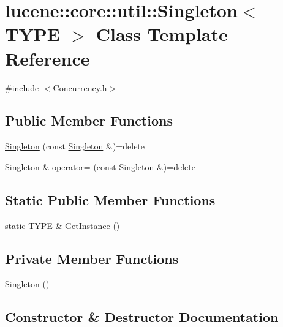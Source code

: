 \hypertarget{classlucene_1_1core_1_1util_1_1Singleton}{}\section{lucene\+:\+:core\+:\+:util\+:\+:Singleton$<$ T\+Y\+PE $>$ Class Template Reference}
\label{classlucene_1_1core_1_1util_1_1Singleton}


{\ttfamily \#include $<$Concurrency.\+h$>$}

\subsection*{Public Member Functions}
\begin{DoxyCompactItemize}
\item 
\mbox{\hyperlink{classlucene_1_1core_1_1util_1_1Singleton_ab5733f8687076b2ce608b096f91f5237}{Singleton}} (const \mbox{\hyperlink{classlucene_1_1core_1_1util_1_1Singleton}{Singleton}} \&)=delete
\item 
\mbox{\hyperlink{classlucene_1_1core_1_1util_1_1Singleton}{Singleton}} \& \mbox{\hyperlink{classlucene_1_1core_1_1util_1_1Singleton_abec7d88a0f754dfa66438cc76e4c5fd5}{operator=}} (const \mbox{\hyperlink{classlucene_1_1core_1_1util_1_1Singleton}{Singleton}} \&)=delete
\end{DoxyCompactItemize}
\subsection*{Static Public Member Functions}
\begin{DoxyCompactItemize}
\item 
static T\+Y\+PE \& \mbox{\hyperlink{classlucene_1_1core_1_1util_1_1Singleton_a5e8079ebbaae97438a52c449ee92aafa}{Get\+Instance}} ()
\end{DoxyCompactItemize}
\subsection*{Private Member Functions}
\begin{DoxyCompactItemize}
\item 
\mbox{\hyperlink{classlucene_1_1core_1_1util_1_1Singleton_a53448fc36821fec1c97716535987eaa7}{Singleton}} ()
\end{DoxyCompactItemize}


\subsection{Constructor \& Destructor Documentation}
\mbox{\label{classlucene_1_1core_1_1util_1_1Singleton_a53448fc36821fec1c97716535987eaa7}} 
